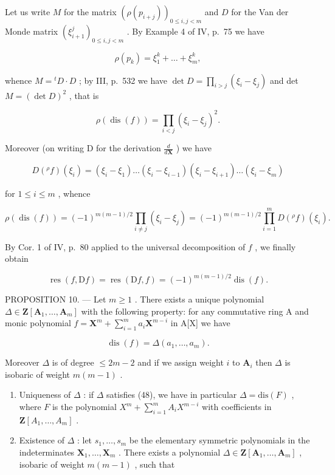 Let us write \(M\) for the matrix \((\rho(p_{i+j}))_{0 \leqslant i,j < m}\) and \(D\) for the Van der Monde matrix \((\xi_{i+1}^{j})_{0 \leqslant i,j < m}\) . By Example 4 of IV, p.~75 we have

\[
\rho (p _ {k}) = \xi_ {1} ^ {k} + \dots + \xi_ {m} ^ {k},
\]

whence \(M = {}^t D \cdot D\) ; by III, p.~532 we have \(\det D = \prod_{i > j} (\xi_i - \xi_j)\) and det \(M = (\det D)^2\) , that is

\[
\rho (\operatorname{dis} (f)) = \prod_ {i <   j} \left(\xi_ {i} - \xi_ {j}\right) ^ {2}.\tag{46}
\]

Moreover (on writing D for the derivation \(\frac{d}{d\mathbf{X}}\) ) we have

\[
D (^ {\rho} f) (\xi_ {i}) = (\xi_ {i} - \xi_ {1}) \dots (\xi_ {i} - \xi_ {i - 1}) (\xi_ {i} - \xi_ {i + 1}) \dots (\xi_ {i} - \xi_ {m})
\]

for \(1 \leqslant i \leqslant m\) , whence

\[
\rho (\operatorname{dis} (f)) = (- 1) ^ {m (m - 1) / 2} \prod_ {i \neq j} (\xi_ {i} - \xi_ {j}) = (- 1) ^ {m (m - 1) / 2} \prod_ {i = 1} ^ {m} D (^ {\rho} f) (\xi_ {i}).
\]

By Cor. 1 of IV, p.~80 applied to the universal decomposition of \(f\) , we finally obtain

\[
\operatorname{res} (f, \mathrm{D} f) = \operatorname{res} (\mathrm{D} f, f) = (- 1) ^ {m (m - 1) / 2} \operatorname{dis} (f).\tag{47}
\]

PROPOSITION 10. --- Let \(m \geqslant 1\) . There exists a unique polynomial \(\Delta \in \mathbf{Z}[\mathbf{A}_1, \ldots, \mathbf{A}_m]\) with the following property: for any commutative ring A and monic polynomial \(f = \mathbf{X}^m + \sum_{i=1}^{m} a_i \mathbf{X}^{m-i}\) in A{[}X{]} we have

\[
\operatorname{dis} (f) = \Delta \left(a _ {1}, \dots , a _ {m}\right).\tag{48}
\]

Moreover \(\Delta\) is of degree \(\leqslant 2m - 2\) and if we assign weight \(i\) to \(\mathbf{A}_i\) then \(\Delta\) is isobaric of weight \(m(m - 1)\) .

\begin{enumerate}
\def\labelenumi{\alph{enumi})}
\item
  Uniqueness of \(\Delta\) : if \(\Delta\) satisfies (48), we have in particular \(\Delta = \text{dis}(F)\) , where \(F\) is the polynomial \(X^{m} + \sum_{i=1}^{m} A_{i} X^{m-i}\) with coefficients in \(\mathbf{Z}[A_{1}, \ldots, A_{m}]\) .
\item
  Existence of \(\Delta\) : let \(s_1, \ldots, s_m\) be the elementary symmetric polynomials in the indeterminates \(\mathbf{X}_1, \ldots, \mathbf{X}_m\) . There exists a polynomial \(\Delta \in \mathbf{Z}[\mathbf{A}_1, \ldots, \mathbf{A}_m]\) , isobaric of weight \(m(m-1)\) , such that
\end{enumerate}

